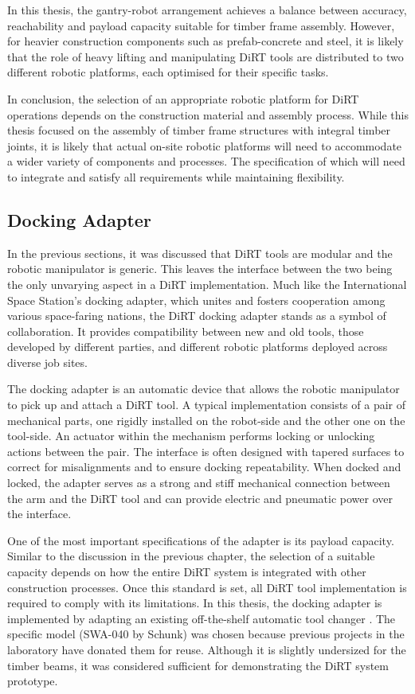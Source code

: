 In this thesis, the gantry-robot arrangement achieves a balance between accuracy, reachability and payload capacity suitable for timber frame assembly. However, for heavier construction components such as prefab-concrete and steel, it is likely that the role of heavy lifting and manipulating DiRT tools are distributed to two different robotic platforms, each optimised for their specific tasks.

In conclusion, the selection of an appropriate robotic platform for DiRT operations depends on the construction material and assembly process. While this thesis focused on the assembly of timber frame structures with integral timber joints, it is likely that actual on-site robotic platforms will need to accommodate a wider variety of components and processes. The specification of which will need to integrate and satisfy all requirements while maintaining flexibility.

\subsection{Docking Adapter}
\label{subsection:discussion-docking-adapter}

In the previous sections, it was discussed that DiRT tools are modular and the robotic manipulator is generic. This leaves the interface between the two being the only unvarying aspect in a DiRT implementation. Much like the International Space Station's docking adapter, which unites and fosters cooperation among various space-faring nations, the DiRT docking adapter stands as a symbol of collaboration. It provides compatibility between new and old tools, those developed by different parties, and different robotic platforms deployed across diverse job sites.

The docking adapter is an automatic device that allows the robotic manipulator to pick up and attach a DiRT tool. A typical implementation consists of a pair of mechanical parts, one rigidly installed on the robot-side and the other one on the tool-side. An actuator within the mechanism performs locking or unlocking actions between the pair. The interface is often designed with tapered surfaces to correct for misalignments and to ensure docking repeatability. When docked and locked, the adapter serves as a strong and stiff mechanical connection between the arm and the DiRT tool and can provide electric and pneumatic power over the interface.

One of the most important specifications of the adapter is its payload capacity. Similar to the discussion in the previous chapter, the selection of a suitable capacity depends on how the entire DiRT system is integrated with other construction processes. Once this standard is set, all DiRT tool implementation is required to comply with its limitations. In this thesis, the docking adapter is implemented by adapting an existing off-the-shelf automatic tool changer . The specific model (SWA-040 by Schunk) was chosen because previous projects in the laboratory have donated them for reuse. Although it is slightly undersized for the timber beams, it was considered sufficient for demonstrating the DiRT system prototype. 

